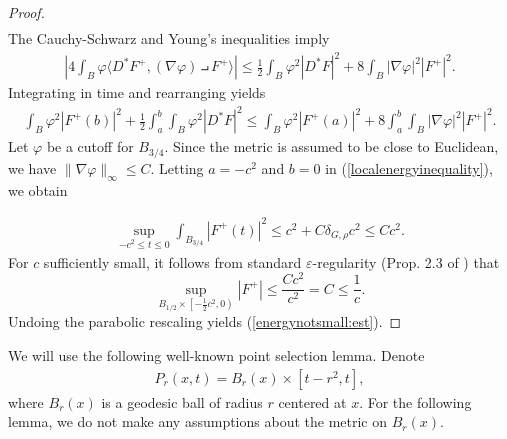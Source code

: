 \documentclass[12pt]{amsart}
\newcommand{\LB}{\left[}
\renewcommand{\1}{{\mathbf 1}}
\newcommand{\eps}{{\varepsilon}}
\theoremstyle{others}
\numberwithin{equation}{section}
\begin{document}
\begin{proof}
\begin{align*}
\end{align*}
The Cauchy-Schwarz and Young's inequalities imply
\begin{align*}
    \left|4\int_B \varphi \langle D^\ast F^+, (\nabla \varphi) \intprod F^+\rangle\right| \leq \frac{1}{2}\int_B \varphi^2 |D^\ast F|^2 + 8\int_B |\nabla \varphi|^2 |F^+|^2.
\end{align*} Integrating in time and rearranging yields 
\begin{align}\label{localenergyinequality}
    \int_B \varphi^2 |F^+(b)|^2 + \frac{1}{2}\int_a^b\int_B \varphi^2 |D^\ast F|^2 \leq \int_B \varphi^2 |F^+(a)|^2 + 8\int_a^b\int_B |\nabla \varphi|^2|F^+|^2.
    \end{align}
    Let \(\varphi\) be a cutoff for \(B_{3/4}.\) Since the metric is assumed to be close to Euclidean, we have $\|\nabla \varphi\|_\infty \leq C.$ Letting \(a = -c^2\) and \(b = 0\) in (\ref{localenergyinequality}), we obtain

    \begin{align}\label{localenergybound}
    \sup_{-c^2 \leq t \leq 0} \int_{B_{3/4}} |F^+(t)|^2 \leq c^2 + C \delta_{G, \rho} c^2 \leq C c^2.
    \end{align}
    For $c$ sufficiently small, it follows from standard $\eps$-regularity (Prop. 2.3 of \cite{instantons}) that %
    $$\sup_{B_{1/2} \times \LB -\frac12 c^2, 0 \right) }|F^+| \leq \frac{C c^2}{c^2} = C \leq \frac{1}{c}.$$
    Undoing the parabolic rescaling yields (\ref{energynotsmall:est}).
\end{proof}


We will use the following well-known point selection lemma. Denote %
\begin{align*}
    P_r(x, t) = B_r(x) \times [t - r^2, t],
\end{align*} where \(B_r(x)\) is a geodesic ball of radius \(r\) centered at \(x\). For the following lemma, we do not make any assumptions about the metric on \(B_r(x)\).
\end{document}

